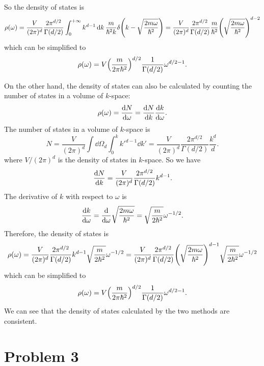 \documentclass{article}
\begin{document}
So the density of states is
\begin{equation}
    \rho(\omega)=\frac{V}{(2\pi)^d}\frac{2\pi^{d/2}}{\Gamma(d/2)}\int_0^{+\infty} k^{d-1}\dd{k}\frac{m}{\hbar^2 k}\delta\qty(k-\sqrt{\frac{2m\omega}{\hbar^2}})=\frac{V}{(2\pi)^d}\frac{2\pi^{d/2}}{\Gamma(d/2)}\frac{m}{\hbar^2}\qty(\sqrt{\frac{2m\omega}{\hbar^2}})^{d-2}
\end{equation}
which can be simplified to
\begin{equation}
    \rho(\omega)=V\qty(\frac{m}{2\pi \hbar^2})^{d/2}\frac{1}{\Gamma(d/2)}\omega^{d/2-1}.
\end{equation}

On the other hand, the density of states can also be calculated by counting the number of states in a volume of $k$-space:
\begin{equation}
    \rho(\omega)=\dv{N}{\omega}=\dv{N}{k}\dv{k}{\omega}.
\end{equation}
The number of states in a volume of $k$-space is
\begin{equation}
    N=\frac{V}{(2\pi)^d}\int \dd{\Omega_d}\int_0^k k'^{d-1}\dd{k'}=\frac{V}{(2\pi)^d}\frac{2\pi^{d/2}}{\Gamma(d/2)}\frac{k^d}{d}.
\end{equation}
where $V/(2\pi)^d$ is the density of states in $k$-space.
So we have
\begin{equation}
    \dv{N}{k}=\frac{V}{(2\pi)^d}\frac{2\pi^{d/2}}{\Gamma(d/2)}k^{d-1}.
\end{equation}
The derivative of $k$ with respect to $\omega$ is
\begin{equation}
    \dv{k}{\omega}=\dv{}{\omega}\sqrt{\frac{2m\omega}{\hbar^2}}=\sqrt{\frac{m}{2\hbar^2}}\omega^{-1/2}.
\end{equation}
Therefore, the density of states is
\begin{equation}
    \rho(\omega)=\frac{V}{(2\pi)^d}\frac{2\pi^{d/2}}{\Gamma(d/2)}k^{d-1}\sqrt{\frac{m}{2\hbar^2}}\omega^{-1/2}=\frac{V}{(2\pi)^d}\frac{2\pi^{d/2}}{\Gamma(d/2)}\qty(\sqrt{\frac{2m\omega}{\hbar^2}})^{d-1}\sqrt{\frac{m}{2\hbar^2}}\omega^{-1/2}
\end{equation}
which can be simplified to
\begin{equation}
    \rho(\omega)=V\qty(\frac{m}{2\pi \hbar^2})^{d/2}\frac{1}{\Gamma(d/2)}\omega^{d/2-1}.
\end{equation}
We can see that the density of states calculated by the two methods are consistent.



\section*{Problem 3}
\end{document}
